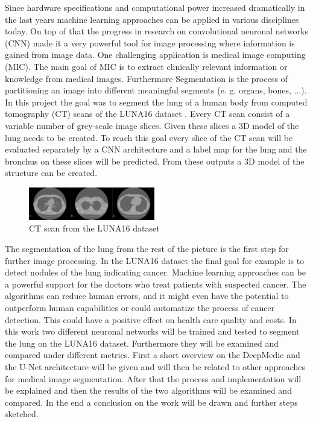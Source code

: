 
Since hardware specifications and computational power increased dramatically in the last years machine learning approaches can be applied in various disciplines today. On top of that the progress in research on convolutional neuronal networks (CNN) made it a very powerful tool for image processing where information is gained from image data.\newline
One challenging application is medical image computing (MIC). The main goal of MIC is to extract clinically relevant information or knowledge from medical images. Furthermore Segmentation is the process of partitioning an image into different meaningful segments (e. g. organs, bones, ...).\newline
In this project the goal was to segment the lung of a human body from computed tomography (CT) scans of the LUNA16 dataset \cite{luna}. Every CT scan consist of a variable number of grey-scale image slices. Given these slices a 3D model of the lung needs to be created. To reach this goal every slice of the CT scan will be evaluated separately by a CNN architecture and a label map for the lung and the bronchus on these slices will be predicted. From these outputs a 3D model of the structure can be created. \newline

\begin{figure}[h!]
	\includegraphics[width=0.49\textwidth, angle=0]{files/ctscans.jpg}
	\caption{CT scan from the LUNA16 dataset}
	\label{scan_picture}
\end{figure}

The segmentation of the lung from the rest of the picture is the first step for further image processing. In the LUNA16 dataset the final goal for example is to detect nodules of the lung indicating cancer. Machine learning approaches can be a powerful support for the doctors who treat patients with suspected cancer. The algorithms can reduce human errors, and it might even have the potential to outperform human capabilities or could automatize the process of cancer detection. This could have a positive effect on health care quality and costs.\newline
In this work two different neuronal networks will be trained and tested to segment the lung on the LUNA16 dataset. Furthermore they will be examined and compared under different metrics.\newline
First a short overview on the DeepMedic and the U-Net architecture will be given and will then be related to other approaches for medical image segmentation. After that the process and implementation will be explained and then the results of the two algorithms will be examined and compared. In the end a conclusion on the work will be drawn and further steps sketched.
